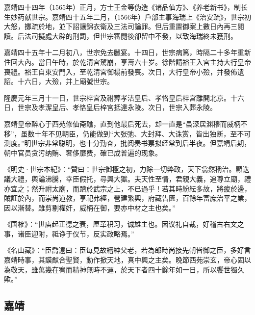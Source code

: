 嘉靖四十四年（1565年）正月，方士王金等伪造《诸品仙方》、《养老新书》，制长生妙药献世宗。嘉靖四十五年二月，（1566年）戶部主事海瑞上《治安疏》，世宗初大怒，擲疏於地，並下詔讓錦衣衛及三法司論罪。但后重置御案上數日內再三閱讀。后法司擬處大辟的刑罰，但世宗審閱後卻留中不發，以致海瑞終未獲刑。

嘉靖四十五年十二月初八，世宗免去臘宴。十四日，世宗病篤，時隔二十多年重新住回大內。當日午時，於乾清宮駕崩，享壽六十岁。徐階請裕王入宮主持大行皇帝喪禮。裕王自東安門入，至乾清宮御榻前發喪。次日，大行皇帝小殮，并發佈遺詔。十六日，大殮，并上廟號世宗。

隆慶元年三月十一日，世宗梓宮及祔葬孝洁皇后、孝恪皇后梓宫離開北京。十六日，世宗及孝潔皇后、孝恪皇后梓宮抵達永陵。次日，世宗入葬永陵。

嘉靖皇帝醉心于西苑修仙斋醮，直到他最后死去，却一直是“虽深居渊穆而威柄不移”，虽数十年不见朝臣，仍能做到“大张弛、大封拜、大诛赏，皆出独断，至不可测度。”明世宗非常聪明，也十分勤奋，批阅奏书票拟经常到后半夜。但嘉靖后期，朝中官员贪污纳贿、奢侈靡费，確已成普遍的现象。

《明史·世宗本紀》：“贊曰：世宗御極之初，力除一切弊政，天下翕然稱治。顧迭議大禮，輿論沸騰，幸臣假托，尋興大獄。夫天性至情，君親大義，追尊立廟，禮亦宜之；然升祔太廟，而躋於武宗之上，不已過乎！若其時紛紜多故，將疲於邊，賊訌於內，而崇尚道教，享祀弗經，營建繁興，府藏告匱，百餘年富庶治平之業，因以漸替。雖剪剔權奸，威柄在御，要亦中材之主也矣。”

《国榷》：“世庙起正德之衰，厘革积习，诚雄主也。因议礼自裁，好稽古右文之事，诸臣迎附，祗诤于仪节，反实政略焉。”

《名山藏》：“臣喬遠曰：臣每見故縉紳父老，若為郎時尚接先朝皆御之臣，多好言嘉靖時事，其謨猷合聖賢，動作掀天地，真中興之主矣。晚節西苑崇玄，帝心固以為敬天，雖萬幾在宥而精神無時不運，於天下者四十餘年如一日，所以饗世獨久歟。”

\subsection{嘉靖}


